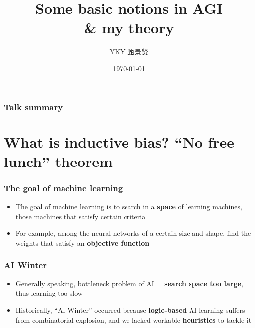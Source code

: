 \documentclass[17pt]{beamer}
\title[AGI theory]{Some basic notions in AGI \\ \& my theory} %
\author{YKY 甄景贤} %
\institute[] %
{
Independent researcher, Hong Kong \\ %
\medskip
\textit{generic.intelligence@gmail.com} %
}
\date{\today} %
\begin{document}
\frame{\titlepage}

\begin{frame}
\frametitle{Talk summary}
\tableofcontents
\end{frame}

%
%




\section[Section]{What is inductive bias? ``No free lunch'' theorem}
\frame{\sectionpage}

\begin{frame}
\frametitle{The goal of machine learning}
\begin{itemize}
	\item The goal of machine learning is to search in a \textbf{space} of learning machines, those machines that satisfy certain criteria
	\item For example, among the neural networks of a certain size and shape, find the weights that satisfy an \textbf{objective function}
\end{itemize}
\end{frame}

\begin{frame}
\frametitle{AI Winter}
\begin{itemize}
	\item Generally speaking, bottleneck problem of AI = {\color{red}\textbf{search space too large}}, thus learning too slow
	\item Historically, ``AI Winter'' occurred because \textbf{logic-based} AI learning suffers from combinatorial explosion, and we lacked workable \textbf{heuristics} to tackle it
\end{itemize}
\end{frame}
\end{document}
